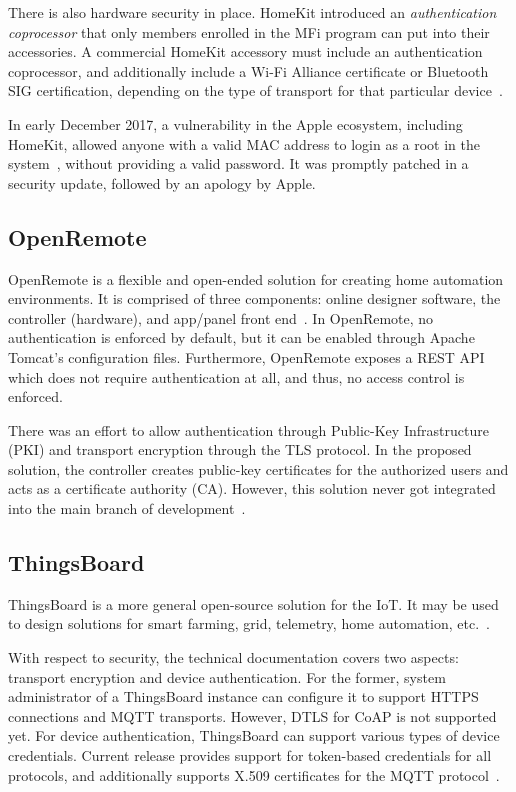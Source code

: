\documentclass[12pt]{article}
\begin{document}
There is also hardware security in place. HomeKit introduced an \emph{authentication coprocessor} that only members enrolled in the MFi program can put into their accessories. A commercial HomeKit accessory must include an authentication coprocessor, and additionally include a Wi-Fi Alliance certificate or Bluetooth SIG certification, depending on the type of transport for that particular device~\cite{related_02}.

In early December 2017, a vulnerability in the Apple ecosystem, including HomeKit, allowed anyone with a valid MAC address to login as a root in the system~\cite{related_03}, without providing a valid password. It was promptly patched in a security update, followed by an apology by Apple.

\subsection{OpenRemote}

OpenRemote is a flexible and open-ended solution for creating home automation environments. It is comprised of three components: online designer software, the controller (hardware), and app/panel front end~\cite{related_04}. In OpenRemote, no authentication is enforced by default, but it can be enabled through Apache Tomcat's configuration files. Furthermore, OpenRemote exposes a REST API which does not require authentication at all, and thus, no access control is enforced.

There was an effort to allow authentication through Public-Key Infrastructure (PKI) and transport encryption through the TLS protocol. In the proposed solution, the controller creates public-key certificates for the authorized users and acts as a certificate authority (CA). However, this solution never got integrated into the main branch of development~\cite{related_05}. 

\subsection{ThingsBoard}

ThingsBoard is a more general open-source solution for the IoT. It may be used to design solutions for smart farming, grid, telemetry, home automation, etc.~\cite{related_06}.

With respect to security, the technical documentation covers two aspects: transport encryption and device authentication. For the former, system administrator of a ThingsBoard instance can configure it to support HTTPS connections and MQTT transports. However, DTLS for CoAP is not supported yet. For device authentication, ThingsBoard can support various types of device credentials. Current release provides support for token-based credentials for all protocols, and additionally supports X.509 certificates for the MQTT protocol~\cite{related_07}.
\end{document}
